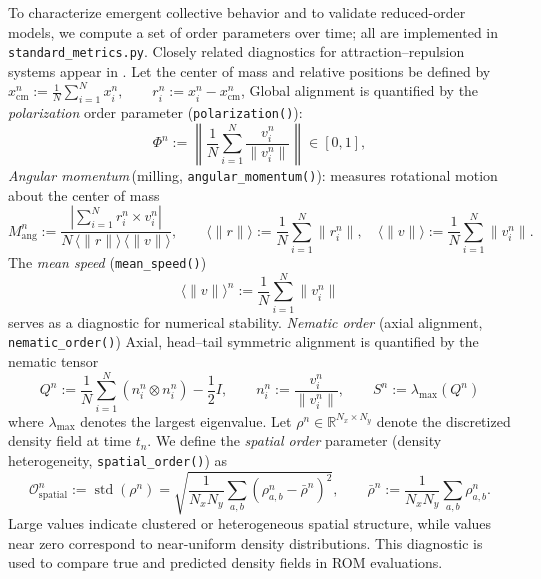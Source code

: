 \documentclass{report}
\theoremstyle{plain}
\theoremstyle{remark}
\numberwithin{equation}{section}              %
\begin{document}
To characterize emergent collective behavior and to validate reduced-order models,
we compute a set of order parameters over time; all are implemented in
\texttt{standard\_metrics.py}.
Closely related diagnostics for attraction--repulsion systems appear in
\cite{bhaskar2019topology}. Let the center of mass and relative positions be defined by
$x_{\mathrm{cm}}^n := \frac{1}{N}\sum_{i=1}^N x_i^n,
\qquad
r_i^n := x_i^n - x_{\mathrm{cm}}^n$,
Global alignment is quantified by the \emph{polarization} order parameter
(\texttt{polarization()}):
\begin{equation}
\Phi^n
:= \left\|\frac{1}{N}\sum_{i=1}^N \frac{v_i^n}{\|v_i^n\|}\right\|
\in [0,1],
\label{eq:polarization}
\end{equation}
\emph{Angular momentum}\,(milling, \texttt{angular\_momentum()}): measures rotational motion about the center of mass
\begin{equation}
M_{\mathrm{ang}}^n
:= \frac{\left|\sum_{i=1}^N r_i^n \times v_i^n\right|}
{N\,\langle\|r\|\rangle\,\langle\|v\|\rangle},
\qquad
\langle\|r\|\rangle := \frac{1}{N}\sum_{i=1}^N \|r_i^n\|,
\quad
\langle\|v\|\rangle := \frac{1}{N}\sum_{i=1}^N \|v_i^n\|.
\label{eq:angular_momentum}
\end{equation}
The \emph{mean speed} (\texttt{mean\_speed()})
\begin{equation}
\langle \|v\| \rangle^n := \frac{1}{N}\sum_{i=1}^N \|v_i^n\|
\label{eq:mean_speed}
\end{equation}
serves as a diagnostic for numerical stability.  \emph{Nematic order} (axial alignment, \texttt{nematic\_order()})
Axial, head--tail symmetric alignment is quantified by the nematic tensor
\begin{equation}
Q^n := \frac{1}{N}\sum_{i=1}^N \left(n_i^n \otimes n_i^n\right) - \frac{1}{2}I,
\qquad
n_i^n := \frac{v_i^n}{\|v_i^n\|},
\qquad
S^n := \lambda_{\max}(Q^n)
\label{eq:nematic_tensor}
\end{equation}
where $\lambda_{\max}$ denotes the largest eigenvalue. Let $\rho^n \in \mathbb{R}^{N_x\times N_y}$ denote the discretized density field at time $t_n$.
We define the \emph{spatial order} parameter (density heterogeneity, \texttt{spatial\_order()}) as
\begin{equation}
\mathcal{O}_{\mathrm{spatial}}^n
:= \operatorname{std}\!\left(\rho^n\right)
= \sqrt{\frac{1}{N_x N_y}
\sum_{a,b}\left(\rho_{a,b}^n - \bar\rho^n\right)^2},
\qquad
\bar\rho^n := \frac{1}{N_x N_y}\sum_{a,b}\rho_{a,b}^n.
\label{eq:spatial_order}
\end{equation}
Large values indicate clustered or heterogeneous spatial structure,
while values near zero correspond to near-uniform density distributions.
This diagnostic is used to compare true and predicted density fields in ROM evaluations.
\end{document}
